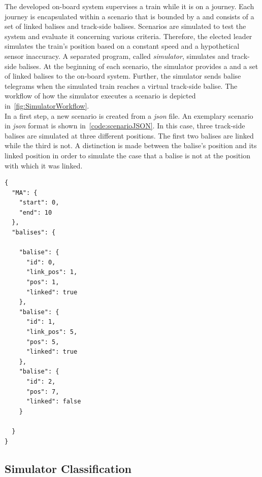 The developed on-board system supervises a train while it is on a journey.
Each journey is encapsulated within a scenario that is bounded by a  and consists of a set of linked balises and track-side balises.
Scenarios are simulated to test the system and evaluate it concerning various criteria.
Therefore, the elected leader simulates the train's position based on a constant speed and a hypothetical sensor inaccuracy.
A separated program, called \textit{simulator}, simulates  and track-side balises.
At the beginning of each scenario, the simulator provides a  and a set of linked balises to the on-board system.
Further, the simulator sends balise telegrams when the simulated train reaches a virtual track-side balise.
The workflow of how the simulator executes a scenario is depicted in~\autoref{fig:SimulatorWorkflow}.
\\

In a first step, a new scenario is created from a \textit{json} file.
An exemplary scenario in \textit{json} format is shown in~\autoref{code:scenarioJSON}.
In this case, three track-side balises are simulated at three different positions.
The first two balises are linked while the third is not.
A distinction is made between the balise's position and its linked position in order to simulate the case that a balise is not at the position with which it was linked.

\begin{minipage}{\linewidth}
\begin{lstlisting}[caption={The used simulator simulates scenarios that are provided in \texttt{JSON} format. Each scenario consists of a \abr{MA} with a start and an end position, as well as a set of balises. Balises can either be linked or not and include an identification number, a linking position, and a position. The linking position is used to simulate a misplaced balise.}, label=code:scenarioJSON]
{
  "MA": {
    "start": 0,
    "end": 10
  },
  "balises": {

    "balise": {
      "id": 0,
      "link_pos": 1,
      "pos": 1,
      "linked": true
    },
    "balise": {
      "id": 1,
      "link_pos": 5,
      "pos": 5,
      "linked": true
    },
    "balise": {
      "id": 2,
      "pos": 7,
      "linked": false
    }

  }
}

\end{lstlisting}
\end{minipage}

\subsection{Simulator Classification}

